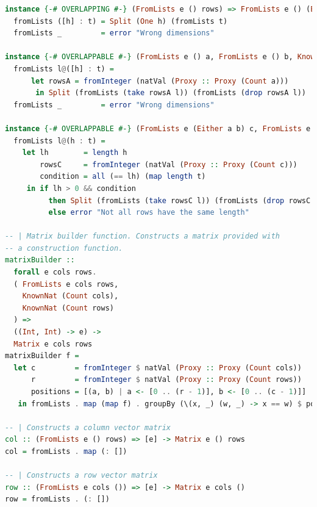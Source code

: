 \documentclass[
  oneside,
  11pt, a4paper,
  footinclude=true,
  headinclude=true,
  cleardoublepage=empty
]{scrbook}
\theoremstyle{definition}
\theoremstyle{definition}
\begin{document}
\begin{lstlisting}[language=Haskell, caption={Matrix.Internal},captionpos=b]
instance {-# OVERLAPPING #-} (FromLists e () rows) => FromLists e () (Either () rows) where
  fromLists ([h] : t) = Split (One h) (fromLists t)
  fromLists _         = error "Wrong dimensions"

instance {-# OVERLAPPABLE #-} (FromLists e () a, FromLists e () b, KnownNat (Count a)) => FromLists e () (Either a b) where
  fromLists l@([h] : t) = 
      let rowsA = fromInteger (natVal (Proxy :: Proxy (Count a)))
       in Split (fromLists (take rowsA l)) (fromLists (drop rowsA l))
  fromLists _         = error "Wrong dimensions"

instance {-# OVERLAPPABLE #-} (FromLists e (Either a b) c, FromLists e (Either a b) d, KnownNat (Count c)) => FromLists e (Either a b) (Either c d) where
  fromLists l@(h : t) =
    let lh        = length h
        rowsC     = fromInteger (natVal (Proxy :: Proxy (Count c)))
        condition = all (== lh) (map length t)
     in if lh > 0 && condition
          then Split (fromLists (take rowsC l)) (fromLists (drop rowsC l))
          else error "Not all rows have the same length"

-- | Matrix builder function. Constructs a matrix provided with
-- a construction function.
matrixBuilder ::
  forall e cols rows.
  ( FromLists e cols rows,
    KnownNat (Count cols),
    KnownNat (Count rows)
  ) =>
  ((Int, Int) -> e) ->
  Matrix e cols rows
matrixBuilder f =
  let c         = fromInteger $ natVal (Proxy :: Proxy (Count cols))
      r         = fromInteger $ natVal (Proxy :: Proxy (Count rows))
      positions = [(a, b) | a <- [0 .. (r - 1)], b <- [0 .. (c - 1)]]
   in fromLists . map (map f) . groupBy (\(x, _) (w, _) -> x == w) $ positions

-- | Constructs a column vector matrix
col :: (FromLists e () rows) => [e] -> Matrix e () rows
col = fromLists . map (: [])

-- | Constructs a row vector matrix
row :: (FromLists e cols ()) => [e] -> Matrix e cols ()
row = fromLists . (: [])


\end{lstlisting}
\end{document}
